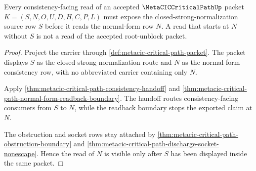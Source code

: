 \begin{theorem}
\label{thm:metacic-critical-path-normalization-source-visibility}
Every consistency-facing read of an accepted $\MetaCICCriticalPathUp$ packet $K=(S,N,O,U,D,H,C,P,L)$ must expose the closed-strong-normalization source row $S$ before it reads the normal-form row $N$. A read that starts at $N$ without $S$ is not a read of the accepted root-unblock packet.
\end{theorem}
\begin{proof}
Project the carrier through \autoref{def:metacic-critical-path-packet}. The packet displays $S$ as the closed-strong-normalization route and $N$ as the normal-form consistency row, with no abbreviated carrier containing only $N$.

Apply \autoref{thm:metacic-critical-path-consistency-handoff} and \autoref{thm:metacic-critical-path-normal-form-readback-boundary}. The handoff routes consistency-facing consumers from $S$ to $N$, while the readback boundary stops the exported claim at $N$.

The obstruction and socket rows stay attached by \autoref{thm:metacic-critical-path-obstruction-boundary} and \autoref{thm:metacic-critical-path-discharge-socket-nonescape}. Hence the read of $N$ is visible only after $S$ has been displayed inside the same packet.
\end{proof}
